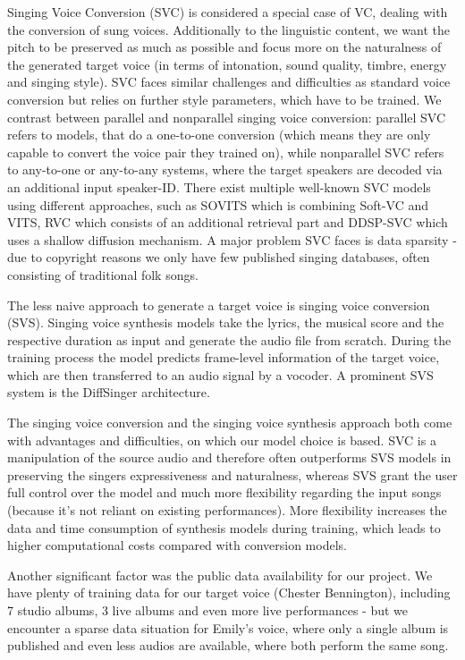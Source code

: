\documentclass[a4paper]{article}
\begin{document}
	Singing Voice Conversion (SVC) is considered a special case of VC, dealing with the conversion of sung voices. Additionally to the linguistic content, we want the pitch to be preserved as much as possible and focus more on the naturalness of the generated target voice (in terms of intonation, sound quality, timbre, energy and singing style). SVC faces similar challenges and difficulties as standard voice conversion but relies on further style parameters, which have to be trained. We contrast between parallel and nonparallel singing voice conversion: parallel SVC refers to models, that do a one-to-one conversion (which means they are only capable to convert the voice pair they trained on), while nonparallel SVC refers to any-to-one or any-to-any systems, where the target speakers are decoded via an additional input speaker-ID. There exist multiple well-known SVC models using different approaches, such as SOVITS which is combining Soft-VC and VITS, RVC which consists of an additional retrieval part and DDSP-SVC which uses a shallow diffusion mechanism. \cite{MediumSVC2023} A major problem SVC faces is data sparsity - due to copyright reasons we only have few published singing databases, often consisting of traditional folk songs.
	
	The less naive approach to generate a target voice is singing voice conversion (SVS). Singing voice synthesis models take the lyrics, the musical score and the respective duration as input and generate the audio file from scratch. During the training process the model predicts frame-level information of the target voice, which are then transferred to an audio signal by a vocoder. \cite{Cho2021} A prominent SVS system is the DiffSinger architecture.
	
	The singing voice conversion and the singing voice synthesis approach both come with advantages and difficulties, on which our model choice is based. SVC is a manipulation of the source audio and therefore often outperforms SVS models in preserving the singers expressiveness and naturalness, whereas SVS grant the user full control over the model and much more flexibility regarding the input songs (because it’s not reliant on existing performances). More flexibility increases the data and time consumption of synthesis models during training, which leads to higher computational costs compared with conversion models. 
	
	Another significant factor was the public data availability for our project. We have plenty of training data for our target voice (Chester Bennington), including 7 studio albums, 3 live albums and even more live performances - but we encounter a sparse data situation for Emily’s voice, where only a single album is published and even less audios are available, where both perform the same song.
	
\end{document}
